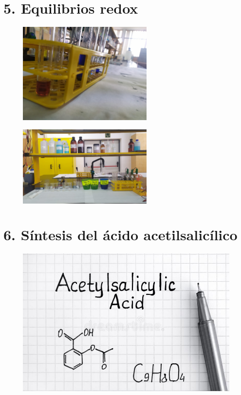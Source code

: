 \documentclass[12pt,letterpaper,oneside,openany,spanish]{book}
\begin{document}
\chapter[Práctica 5]{5. Equilibrios redox}
\thispagestyle{empty}
\begin{figure}[h]
    \centering
    \includegraphics[width=0.6\textwidth]{prac5/Aesthetic.jpeg}
\end{figure}
\begin{figure}[h]
    \centering
    \includegraphics[width=0.6\textwidth]{prac5/Inventario 5 todo.jpeg}
\end{figure}


\chapter[Práctica 6]{6. Síntesis del ácido acetilsalicílico}
\thispagestyle{empty}
\vspace{1cm}
\begin{figure}[h]
    \centering
    \hspace*{-0.2cm}
    \includegraphics[width=1\textwidth]{fotos/fórmula-química-del-ácido-acetilsalicílico-con-la-pluma-114646429.jpg}
    \hspace*{-0.4cm}
\end{figure}

\end{document}
